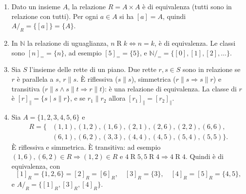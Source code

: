 \documentclass[11pt,a4paper]{article}
\begin{document}
\begin{esempio}
\leavevmode
\begin{enumerate}
    \item Dato un insieme $A$, la relazione $R = A \times A$ è di
          equivalenza (tutti sono in relazione con tutti). Per ogni
          $a \in A$ si ha $[a] = A$, quindi $A/_R = \{[a]\} = \{A\}$.

    \item In $\mathbb{N}$ la relazione di uguaglianza,
          $n \mathrel{R} k \iff n = k$, è di equivalenza. Le classi sono
          $[n]_= = \{n\}$, ad esempio $[5]_= = \{5\}$, e
          $\mathbb{N}/_= = \{[0], [1], [2], \dots\}$.

    \item Sia $S$ l'insieme delle rette di un piano. Due rette
          $r, s \in S$ sono in relazione se $r$ è parallela a $s$,
          $r \parallel s$. È riflessiva ($s \parallel s$), simmetrica
          ($r \parallel s \Rightarrow s \parallel r$) e transitiva
          ($r \parallel s \land s \parallel t \Rightarrow r \parallel t$):
          è una relazione di equivalenza. La classe di $r$ è
          $[r]_{\parallel} = \{s \mid s \parallel r\}$, e se
          $r_1 \parallel r_2$ allora $[r_1]_{\parallel} =
          [r_2]_{\parallel}$.

    \item Sia $A = \{1, 2, 3, 4, 5, 6\}$ e
          \[
          \begin{split}
          R = \{&(1,1), (1,2), (1,6), (2,1), (2,6), (2,2), (6,6),\\
          &(6,1), (6,2), (3,3), (4,4), (4,5), (5,4), (5,5)\}.
          \end{split}
          \]
          È riflessiva e simmetrica. È transitiva: ad esempio
          $(1,6), (6,2) \in R \Rightarrow (1,2) \in R$ e
          $4 \mathrel{R} 5, 5 \mathrel{R} 4 \Rightarrow 4 \mathrel{R} 4$.
          Quindi è di equivalenza, con
          \[
          [1]_R = \{1, 2, 6\} = [2]_R = [6]_R, \quad [3]_R = \{3\},
          \quad [4]_R = [5]_R = \{4, 5\},
          \]
          e $A/_R = \{[1]_R, [3]_R, [4]_R\}$.
\end{enumerate}
\end{esempio}
\end{document}
